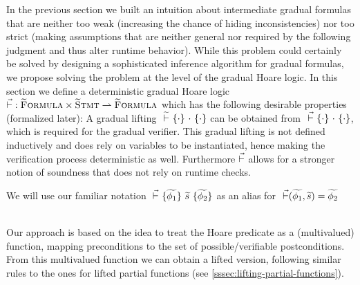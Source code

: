 %
%
%
%

In the previous section we built an intuition about intermediate gradual formulas that are neither too weak (increasing the chance of hiding inconsistencies) nor too strict (making assumptions that are neither general nor required by the following judgment and thus alter runtime behavior).
While this problem could certainly be solved by designing a sophisticated inference algorithm for gradual formulas, we propose solving the problem at the level of the gradual Hoare logic.
In this section we define a deterministic gradual Hoare logic $\vec{\vdash} : \textup{\textsc{\ensuremath{\widetilde{\text{F}}}ormula}} \times \textup{\textsc{\ensuremath{\widetilde{\text{S}}}tmt}} \rightharpoonup \textup{\textsc{\ensuremath{\widetilde{\text{F}}}ormula}}$ which has the following desirable properties (formalized later):
A gradual lifting ${} \,\,\widetilde{\vdash}\,\, \{{\cdot}\} ~{\cdot}~ \{{\cdot}\}$ can be obtained from ${} \,\,\vec{\vdash}\,\, \{{\cdot}\} ~{\cdot}~ \{{\cdot}\}$, which is required for the gradual verifier.
This gradual lifting is not defined inductively and does rely on variables to be instantiated, hence making the verification process deterministic as well.
Furthermore $\vec{\vdash}$ allows for a stronger notion of soundness that does not rely on runtime checks.

We will use our familiar notation ${} \,\,\vec{\vdash}\,\, \{{\widetilde{\phi_1}}\} ~{\widetilde{s}}~ \{{\widetilde{\phi_2}}\}$ as an alias for $~\vec{\vdash}(\widetilde{\phi_1}, \widetilde{s}) = \widetilde{\phi_2}$

~\\
Our approach is based on the idea to treat the Hoare predicate as a (multivalued) function, mapping preconditions to the set of possible/verifiable postconditions.
From this multivalued function we can obtain a lifted version, following similar rules to the ones for lifted partial functions (see \ref{sssec:lifting-partial-functions}).

